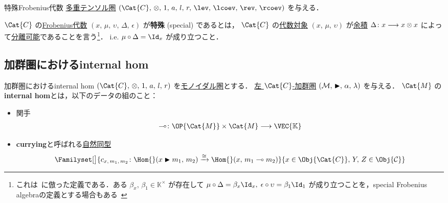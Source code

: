 \documentclass[TQFT_main]{subfiles}
\begin{document}
\begin{mydef}[label=def:special-Frobenius]{特殊Frobenius代数}
    \hyperref[def:tensorfusion-cat]{多重テンソル圏} $(\Cat{C},\, \otimes,\, 1,\, a,\, l,\,r,\, \lev,\, \lcoev,\, \rev,\, \rcoev)$ を与える．

    $\Cat{C}$ の\hyperref[def:Frobenius-alg]{Frobenius代数} $(x,\, \mu,\, \upsilon,\, \Delta,\, \epsilon)$ が\textbf{特殊} (special) であるとは，
    $\Cat{C}$ の\hyperref[def:algobj]{代数対象} $(x,\, \mu,\, \upsilon)$ が\hyperref[def:algobj]{余積} $\Delta \colon x \longrightarrow x \otimes x$ によって\hyperref[def:separable-alg]{分離可能}であることを言う\footnote{これは~\cite[p.17]{coecke2008quantummeasurementssums}に倣った定義である．ある $\beta_x,\, \beta_1 \in \mathbb{K}^\times$ が存在して $\mu \circ \Delta = \beta_x \Id_x,\; \epsilon \circ \upsilon = \beta_1 \Id_1$ が成り立つことを，special Frobenius algebraの定義とする場合もある~\cite[Definition 3.4-(i)]{Fuchs2002cm}}．
    i.e. $\mu \circ \Delta = \Id_x$ が成り立つこと．
\end{mydef}


\subsection{加群圏におけるinternal hom}


\begin{mydef}[label=def:internal-hom,breakable]{加群圏におけるinternal hom}
    $(\Cat{C},\, \otimes,\, 1,\, a,\, l,\, r)$ を\hyperref[redef:monoidal-category]{モノイダル圏}とする．
    \hyperref[def:modulecat]{左 $\Cat{C}$-加群圏} $(\mathcal{M},\, \blacktriangleright,\, \alpha,\, \lambda)$ を与える．
    $\Cat{M}$ の\textbf{internal hom}とは，以下のデータの組のこと：
    \begin{itemize}
        \item 関手
        \begin{align}
            \multimap \colon \OP{\Cat{M}} \times \Cat{M} \lto \VEC{\mathbb{K}}
        \end{align}
        \item 
        \textbf{currying}と呼ばれる\hyperref[def:nat]{自然同型}
        \begin{align}
            \Familyset[\big]{c_{x,\, m_1,\, m_2} \colon \Hom{}(x \btr m_1,\, m_2) \xrightarrow{\cong} \Hom{}(x,\, m_1 \multimap m_2)}{x \in \Obj{\Cat{C}},\, Y,\, Z \in \Obj{\mathcal{C}}}
        \end{align}
    \end{itemize}    
\end{mydef}
\end{document}
